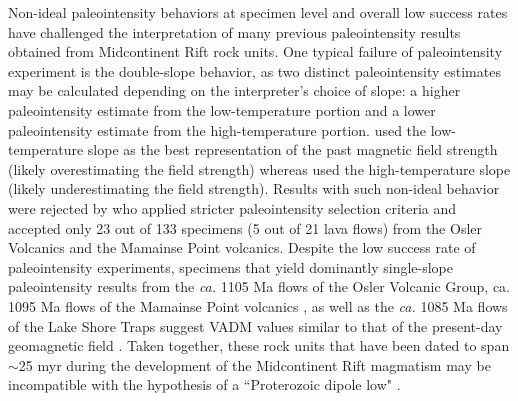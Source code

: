 \documentclass[draft]{agujournal2019}
\begin{document}
Non-ideal paleointensity behaviors at specimen level and overall low success rates have challenged the interpretation of many previous paleointensity results obtained from Midcontinent Rift rock units. One typical failure of paleointensity experiment is the double-slope behavior, as two distinct paleointensity estimates may be calculated depending on the interpreter's choice of slope: a higher paleointensity estimate from the low-temperature portion and a lower paleointensity estimate from the high-temperature portion.  used the low-temperature slope as the best representation of the past magnetic field strength (likely overestimating the field strength) whereas  used the high-temperature slope (likely underestimating the field strength). Results with such non-ideal behavior were rejected by  who applied stricter paleointensity selection criteria and accepted only 23 out of 133 specimens (5 out of 21 lava flows) from the Osler Volcanics and the Mamainse Point volcanics. Despite the low success rate of paleointensity experiments, specimens that yield dominantly single-slope paleointensity results from the \textit{ca.} 1105 Ma flows of the Osler Volcanic Group, ca. 1095 Ma flows of the Mamainse Point volcanics \cite{Sprain2018a}, as well as the \textit{ca.} 1085 Ma flows of the Lake Shore Traps \cite{Kulakov2013a} suggest VADM values similar to that of the present-day geomagnetic field \cite{Sprain2018a}. Taken together, these rock units that have been dated to span $\sim$25 myr during the development of the Midcontinent Rift magmatism \cite{Swanson-Hysell2019a} may be incompatible with the hypothesis of a ``Proterozoic dipole low" \cite{Biggin2009a}. 
\end{document}
